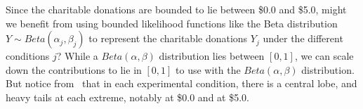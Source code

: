 Since the charitable donations are bounded to lie between \$0.0 and \$5.0, might we benefit from using bounded likelihood functions like the Beta distribution $Y \sim Beta(\alpha_j, \beta_j)$ to represent the charitable donations $Y_j$ under the different conditions $j$? While a $Beta(\alpha, \beta)$ distribution lies between $[0,1]$, we can scale down the contributions to lie in $[0,1]$ to use with the $Beta(\alpha, \beta)$ distribution. But notice from~ that in each experimental condition, there is a central lobe, and heavy tails at each extreme, notably at \$0.0 and at \$5.0. 

